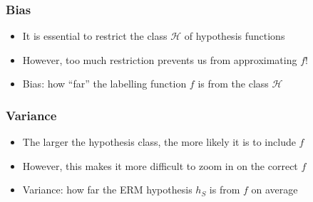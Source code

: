 \documentclass[10pt]{beamer}
\begin{document}
\begin{frame}
  \frametitle{Bias}
  \begin{center}
  \end{center}
  \begin{itemize}
	\item It is essential to {\color{blue} restrict} the class $\mathcal{H}$ of hypothesis functions
	\item However, too much restriction {\color{red} prevents us} from approximating $f$!
	\item {\color{purple} Bias}: how ``far'' the labelling function $f$ is from the class $\mathcal{H}$
  \end{itemize}
\end{frame}

\begin{frame}
  \frametitle{Variance}
  \begin{center}
  \end{center}
  \begin{itemize}
	\item The larger the hypothesis class, the more likely it is to include $f$
	\item However, this makes it more difficult to zoom in on the correct $f$
	\item {\color{purple} Variance}: how far the ERM hypothesis $h_S$ is from $f$ on average
  \end{itemize}
\end{frame}
\end{document}
